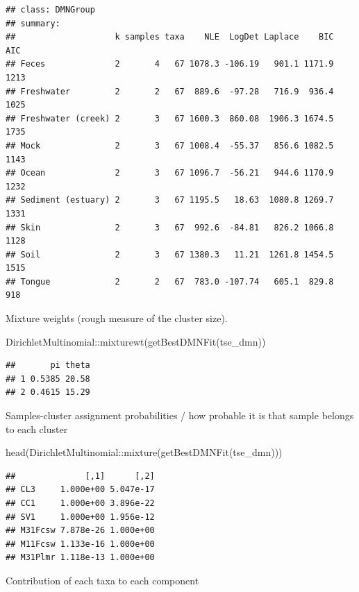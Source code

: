 \documentclass[
]{book}
\newenvironment{Shaded}{\begin{snugshade}}{\end{snugshade}}
\newcommand{\FunctionTok}[1]{\textcolor[rgb]{0.00,0.00,0.00}{#1}}
\newcommand{\NormalTok}[1]{#1}
\newcommand{\SpecialCharTok}[1]{\textcolor[rgb]{0.00,0.00,0.00}{#1}}
\begin{document}
\begin{verbatim}
## class: DMNGroup 
## summary:
##                    k samples taxa    NLE  LogDet Laplace    BIC  AIC
## Feces              2       4   67 1078.3 -106.19   901.1 1171.9 1213
## Freshwater         2       2   67  889.6  -97.28   716.9  936.4 1025
## Freshwater (creek) 2       3   67 1600.3  860.08  1906.3 1674.5 1735
## Mock               2       3   67 1008.4  -55.37   856.6 1082.5 1143
## Ocean              2       3   67 1096.7  -56.21   944.6 1170.9 1232
## Sediment (estuary) 2       3   67 1195.5   18.63  1080.8 1269.7 1331
## Skin               2       3   67  992.6  -84.81   826.2 1066.8 1128
## Soil               2       3   67 1380.3   11.21  1261.8 1454.5 1515
## Tongue             2       2   67  783.0 -107.74   605.1  829.8  918
\end{verbatim}

Mixture weights (rough measure of the cluster size).

\begin{Shaded}
\begin{Highlighting}[]
\NormalTok{DirichletMultinomial}\SpecialCharTok{::}\FunctionTok{mixturewt}\NormalTok{(}\FunctionTok{getBestDMNFit}\NormalTok{(tse\_dmn))}
\end{Highlighting}
\end{Shaded}

\begin{verbatim}
##       pi theta
## 1 0.5385 20.58
## 2 0.4615 15.29
\end{verbatim}

Samples-cluster assignment probabilities / how probable it is that sample belongs
to each cluster

\begin{Shaded}
\begin{Highlighting}[]
\FunctionTok{head}\NormalTok{(DirichletMultinomial}\SpecialCharTok{::}\FunctionTok{mixture}\NormalTok{(}\FunctionTok{getBestDMNFit}\NormalTok{(tse\_dmn)))}
\end{Highlighting}
\end{Shaded}

\begin{verbatim}
##              [,1]      [,2]
## CL3     1.000e+00 5.047e-17
## CC1     1.000e+00 3.896e-22
## SV1     1.000e+00 1.956e-12
## M31Fcsw 7.878e-26 1.000e+00
## M11Fcsw 1.133e-16 1.000e+00
## M31Plmr 1.118e-13 1.000e+00
\end{verbatim}

Contribution of each taxa to each component
\end{document}
